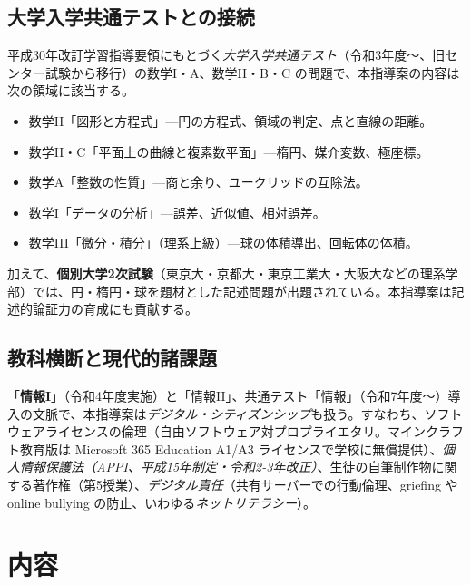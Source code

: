 \documentclass[12pt,a4paper]{scrartcl}
\newcommand{\acc}[1]{\textcolor{accent}{\textbf{#1}}}
\begin{document}
\subsection{大学入学共通テストとの接続}\label{sec:enem}

平成30年改訂学習指導要領にもとづく\emph{大学入学共通テスト}（令和3年度〜、旧センター試験から移行）の数学I・A、数学II・B・C の問題で、本指導案の内容は次の領域に該当する。

\begin{itemize}[leftmargin=1.3em,itemsep=0.15em,topsep=0.3em]
  \item 数学II「図形と方程式」---円の方程式、領域の判定、点と直線の距離。
  \item 数学II・C「平面上の曲線と複素数平面」---楕円、媒介変数、極座標。
  \item 数学A「整数の性質」---商と余り、ユークリッドの互除法。
  \item 数学I「データの分析」---誤差、近似値、相対誤差。
  \item 数学III「微分・積分」（理系上級）---球の体積導出、回転体の体積。
\end{itemize}

加えて、\acc{個別大学2次試験}（東京大・京都大・東京工業大・大阪大などの理系学部）では、円・楕円・球を題材とした記述問題が出題されている。本指導案は記述的論証力の育成にも貢献する。

\subsection{教科横断と現代的諸課題}

「\acc{情報I}」（令和4年度実施）と「情報II」、共通テスト「情報」（令和7年度〜）導入の文脈で、本指導案は\emph{デジタル・シティズンシップ}も扱う。すなわち、ソフトウェアライセンスの倫理（自由ソフトウェア対プロプライエタリ。マインクラフト教育版は Microsoft 365 Education A1/A3 ライセンスで学校に無償提供）、\emph{個人情報保護法（APPI、平成15年制定・令和2-3年改正）}、生徒の自筆制作物に関する著作権（第5授業）、\emph{デジタル責任}（共有サーバーでの行動倫理、griefing や online bullying の防止、いわゆる\emph{ネットリテラシー}）。

\section{内容}\label{sec:conteudos}
\end{document}
